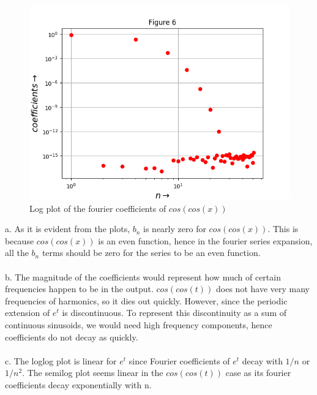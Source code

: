 \documentclass[11pt, a4paper]{article}
\begin{document}
	\begin{figure}[!tbh]
   	\centering
   	\includegraphics[scale=0.6]{Figure_6.png}   
   	\caption{Log plot of the fourier coefficients of $cos(cos(x))$}
   	\label{fig:sample}
   \end{figure} 

a. As it is evident from the plots, $b_n$ is nearly zero for $cos(cos(x))$. This is because $cos(cos(x))$ is an even function, hence in the fourier series expansion, all the $b_n$ terms should be zero for the series to be an even function.\\\\
b. The magnitude of the coefficients would represent how much of certain frequencies happen to be in the output. $cos(cos(t))$ does not have very many frequencies of harmonics, so it dies out quickly. However, since the periodic extension of $e^{t}$ is discontinuous. To represent this discontinuity as a sum of continuous sinusoids, we would need high frequency components, hence coefficients do not decay as quickly.\\\\
c. The loglog plot is linear for $e^{t}$ since Fourier coefficients of $e^{t}$ decay with $1/n$ or $1/n^{2}$. The semilog plot seems linear in the $cos(cos(t))$ case as its fourier coefficients decay exponentially with n.
\end{document}
